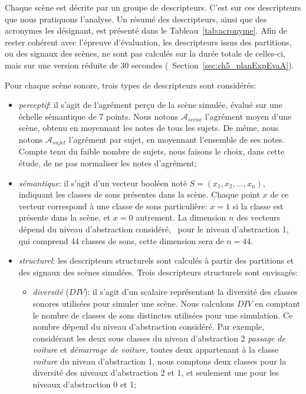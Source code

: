Chaque scène est décrite par un groupe de descripteurs. C'est sur ces descripteurs que nous pratiquons l'analyse. Un résumé des descripteurs, ainsi que des acronymes les désignant, est présenté dans le Tableau~\ref{tab:acronyme}. Afin de rester cohérent avec l'épreuve d'évaluation, les descripteurs issus des partitions, ou des signaux des scènes, ne sont pas calculés sur la durée totale de celles-ci, mais sur une version réduite de 30 secondes (\cf~Section~\ref{sec:ch5_planExpEvaA}). 

Pour chaque scène sonore, trois types de descripteurs sont considérés:

\begin{itemize}
\item \emph{perceptif}: il s'agit de l'agrément perçu de la scène simulée, évalué sur une échelle sémantique de 7 points. Nous notons $\mathcal{A}_{scene}$ l'agrément moyen d'une scène, obtenu en moyennant les notes de tous les sujets. De même, nous notons  $\mathcal{A}_{sujet}$ l'agrément par sujet, en moyennant l'ensemble de ses notes. Compte tenu du faible nombre de sujets, nous faisons le choix, dans cette étude, de ne pas normaliser les notes d'agrément;
\item \emph{sémantique}: il s'agit d'un vecteur booléen noté $S=(x_1,x_2,\ldots,x_n)$, indiquant les classes de sons présentes dans la scène. Chaque point $x$ de ce vecteur correspond à une classe de sons particulière: $x=1$ si la classe est présente dans la scène, et $x=0$ autrement. La dimension $n$ des vecteurs dépend du niveau d'abstraction considéré, \eg~pour le niveau d'abstraction 1, qui comprend $44$ classes de sons, cette dimension sera de $n=44$.
\item \emph{structurel}: les descripteurs structurels sont calculés à partir des partitions et des signaux des scènes simulées. Trois descripteurs structurels sont envisagés:
\begin{itemize}
\item \emph{diversité} ($DIV$): il s'agit d'un scalaire représentant la diversité des classes sonores utilisées pour simuler une scène. Nous calculons $DIV$ en comptant le nombre de classes de sons distinctes utilisées pour une simulation. Ce nombre dépend du niveau d'abstraction considéré. Par exemple, considérant les deux sous classes du niveau d'abstraction 2 \emph{passage de voiture} et \emph{démarrage de voiture}, toutes deux appartenant à la classe \emph{voiture} du niveau d'abstraction 1, nous comptons deux classes pour la diversité des niveaux d'abstraction 2 et 1, et seulement une pour les niveaux d'abstraction 0 et 1;

\end{itemize}
\end{itemize}
